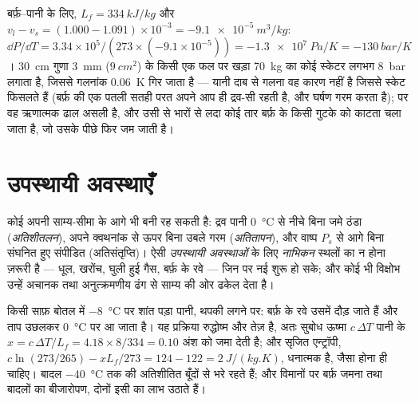 \begin{example}[स्केट के नीचे बर्फ़]\label{ex:b1:phase-changes:skate}
बर्फ़--पानी के लिए, $L_f = \qty{334}{kJ/kg}$ और $v_l - v_s = (1.000 - 1.091)
\times 10^{-3} = \qty{-9.1e-5}{m^3/kg}$: $\dd P/\dd T = 3.34 \times 10^5/(273 \times
(-9.1 \times 10^{-5})) = \qty{-1.3e7}{Pa/K} = \qty{-130}{bar/K}$। \qty{30}{cm}
गुणा \qty{3}{mm} ($\qty{9}{cm^2}$) के किसी एक फल पर खड़ा \qty{70}{kg} का कोई
स्केटर लगभग \qty{8}{bar} लगाता है, जिससे गलनांक \qty{0.06}{K} गिर जाता है
--- यानी दाब से गलना वह कारण नहीं है जिससे स्केट फिसलते हैं (बर्फ़ की एक
पतली सतही परत अपने आप ही द्रव-सी रहती है, और घर्षण गरम करता है); पर वह
ऋणात्मक ढाल असली है, और उसी से भारों से लदा कोई तार बर्फ़ के किसी गुटके को
काटता चला जाता है, जो उसके पीछे फिर जम जाती है।
\end{example}

\section{उपस्थायी अवस्थाएँ}

\begin{definition}[अतिशीतलन, अतितापन]\label{def:b1:phase-changes:metastable}
कोई  अपनी साम्य-सीमा के आगे भी बनी रह सकती है: द्रव पानी
\qty{0}{\degreeCelsius} से नीचे बिना जमे ठंडा (\emph{अतिशीतलन}), अपने
क्वथनांक से ऊपर बिना उबले गरम (\emph{अतितापन}), और वाष्प $P_s$ से आगे बिना
संघनित हुए संपीडित (अतिसंतृप्ति)। ऐसी \emph{उपस्थायी अवस्थाओं} के लिए
\emph{नाभिकन} स्थलों का न होना ज़रूरी है --- धूल, खरोंच, घुली हुई गैस,
बर्फ़ के रवे --- जिन पर नई  शुरू हो सके; और कोई भी विक्षोभ उन्हें
अचानक तथा अनुत्क्रमणीय ढंग से साम्य की ओर ढकेल देता है।
\end{definition}

\begin{example}[अतिशीतित बोतल]\label{ex:b1:phase-changes:supercooled}
किसी साफ़ बोतल में \qty{-8}{\degreeCelsius} पर शांत पड़ा पानी, थपकी लगने पर:
बर्फ़ के रवे उसमें दौड़ जाते हैं और ताप उछलकर
\qty{0}{\degreeCelsius} पर आ जाता है। यह प्रक्रिया रुद्धोष्म और तेज़ है,
अतः सुबोध ऊष्मा $c\,\Delta T$ पानी के $x = c\,\Delta T/L_f = 4.18 \times 8/334 =
0.10$ अंश को जमा देती है; और सृजित एन्ट्रॉपी, $c\ln(273/265) - xL_f/273 =
124 - 122 = \qty{+2}{J/(kg.K)}$, धनात्मक है, जैसा होना ही चाहिए। बादल
\qty{-40}{\degreeCelsius} तक की अतिशीतित बूँदों से भरे रहते हैं; और
विमानों पर बर्फ़ जमना तथा बादलों का बीजारोपण, दोनों इसी का लाभ उठाते हैं।
\end{example}

